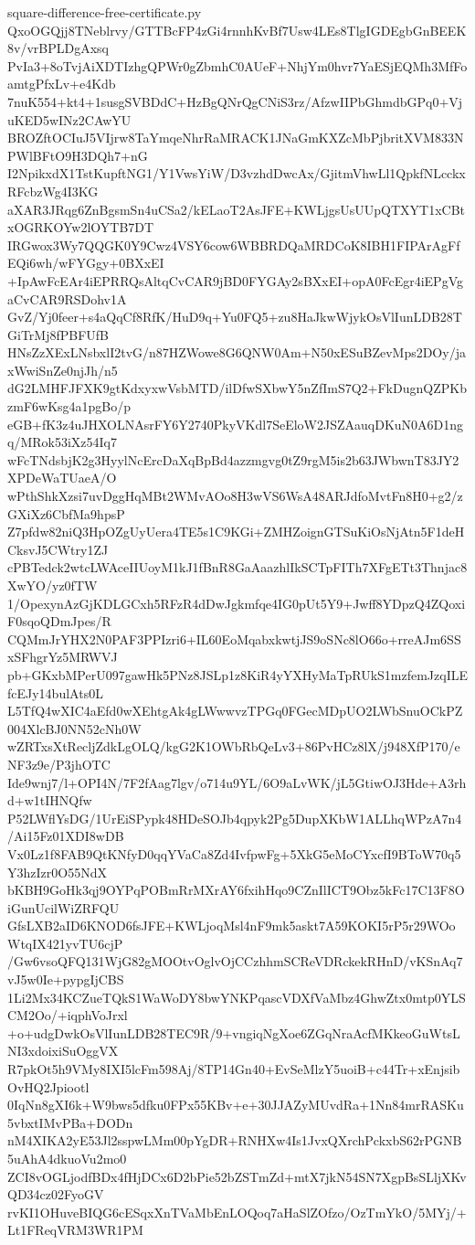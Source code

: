 \documentclass[11pt]{article}
\theoremstyle{definition}
\theoremstyle{remark}
\begin{document}
\begin{filecontents*}[overwrite]{square-difference-free-certificate.py}
QxoOGQjj8TNeblrvy/GTTBcFP4zGi4rnnhKvBf7Usw4LEs8TlgIGDEgbGnBEEK8v/vrBPLDgAxsq
PvIa3+8oTvjAiXDTIzhgQPWr0gZbmhC0AUeF+NhjYm0hvr7YaESjEQMh3MfFoamtgPfxLv+e4Kdb
7nuK554+kt4+1susgSVBDdC+HzBgQNrQgCNiS3rz/AfzwIIPbGhmdbGPq0+VjuKED5wINz2CAwYU
BROZftOCIuJ5VIjrw8TaYmqeNhrRaMRACK1JNaGmKXZcMbPjbritXVM833NPWlBFtO9H3DQh7+nG
I2NpikxdX1TstKupftNG1/Y1VwsYiW/D3vzhdDwcAx/GjitmVhwLl1QpkfNLcckxRFcbzWg4I3KG
aXAR3JRqg6ZnBgsmSn4uCSa2/kELaoT2AsJFE+KWLjgsUsUUpQTXYT1xCBtxOGRKOYw2lOYTB7DT
IRGwox3Wy7QQGK0Y9Cwz4VSY6cow6WBBRDQaMRDCoK8IBH1FIPArAgFfEQi6wh/wFYGgy+0BXxEI
+IpAwFcEAr4iEPRRQsAltqCvCAR9jBD0FYGAy2sBXxEI+opA0FcEgr4iEPgVgaCvCAR9RSDohv1A
GvZ/Yj0feer+s4aQqCf8RfK/HuD9q+Yu0FQ5+zu8HaJkwWjykOsVlIunLDB28TGiTrMj8fPBFUfB
HNsZzXExLNsbxlI2tvG/n87HZWowe8G6QNW0Am+N50xESuBZevMps2DOy/jaxWwiSnZe0njJh/n5
dG2LMHFJFXK9gtKdxyxwVsbMTD/ilDfwSXbwY5nZfImS7Q2+FkDugnQZPKbzmF6wKsg4a1pgBo/p
eGB+fK3z4uJHXOLNAsrFY6Y2740PkyVKdl7SeEloW2JSZAauqDKuN0A6D1ngq/MRok53iXz54Iq7
wFcTNdsbjK2g3HyylNcErcDaXqBpBd4azzmgvg0tZ9rgM5is2b63JWbwnT83JY2XPDeWaTUaeA/O
wPthShkXzsi7uvDggHqMBt2WMvAOo8H3wVS6WsA48ARJdfoMvtFn8H0+g2/zGXiXz6CbfMa9hpsP
Z7pfdw82niQ3HpOZgUyUera4TE5s1C9KGi+ZMHZoignGTSuKiOsNjAtn5F1deHCksvJ5CWtry1ZJ
cPBTedck2wtcLWAceIIUoyM1kJ1fBnR8GaAaazhlIkSCTpFITh7XFgETt3Thnjac8XwYO/yz0fTW
1/OpexynAzGjKDLGCxh5RFzR4dDwJgkmfqe4IG0pUt5Y9+Jwff8YDpzQ4ZQoxiF0sqoQDmJpes/R
CQMmJrYHX2N0PAF3PPIzri6+IL60EoMqabxkwtjJS9oSNc8lO66o+rreAJm6SSxSFhgrYz5MRWVJ
pb+GKxbMPerU097gawHk5PNz8JSLp1z8KiR4yYXHyMaTpRUkS1mzfemJzqILEfcEJy14bulAts0L
L5TfQ4wXIC4aEfd0wXEhtgAk4gLWwwvzTPGq0FGecMDpUO2LWbSnuOCkPZ004XlcBJ0NN52cNh0W
wZRTxsXtRecljZdkLgOLQ/kgG2K1OWbRbQeLv3+86PvHCz8lX/j948XfP170/eNF3z9e/P3jhOTC
Ide9wnj7/l+OPI4N/7F2fAag7lgv/o714u9YL/6O9aLvWK/jL5GtiwOJ3Hde+A3rhd+w1tIHNQfw
P52LWflYsDG/1UrEiSPypk48HDeSOJb4qpyk2Pg5DupXKbW1ALLhqWPzA7n4/Ai15Fz01XDI8wDB
Vx0Lz1f8FAB9QtKNfyD0qqYVaCa8Zd4IvfpwFg+5XkG5eMoCYxcfI9BToW70q5Y3hzIzr0O55NdX
bKBH9GoHk3qj9OYPqPOBmRrMXrAY6fxihHqo9CZnIlICT9Obz5kFc17C13F8OiGunUcilWiZRFQU
GfsLXB2aID6KNOD6fsJFE+KWLjoqMsl4nF9mk5askt7A59KOKI5rP5r29WOoWtqIX421yvTU6cjP
/Gw6vsoQFQ131WjG82gMOOtvOglvOjCCzhhmSCReVDRckekRHnD/vKSnAq7vJ5w0Ie+pypgIjCBS
1Li2Mx34KCZueTQkS1WaWoDY8bwYNKPqascVDXfVaMbz4GhwZtx0mtp0YLSCM2Oo/+iqphVoJrxl
+o+udgDwkOsVlIunLDB28TEC9R/9+vngiqNgXoe6ZGqNraAcfMKkeoGuWtsLNI3xdoixiSuOggVX
R7pkOt5h9VMy8IXI5lcFm598Aj/8TP14Gn40+EvSeMlzY5uoiB+c44Tr+xEnjsibOvHQ2Jpiootl
0IqNn8gXI6k+W9bws5dfku0FPx55KBv+e+30JJAZyMUvdRa+1Nn84mrRASKu5vbxtIMvPBa+DODn
nM4XIKA2yE53Jl2sspwLMm00pYgDR+RNHXw4Is1JvxQXrchPckxbS62rPGNB5uAhA4dkuoVu2mo0
ZCI8vOGLjodfBDx4fHjDCx6D2bPie52bZSTmZd+mtX7jkN54SN7XgpBsSLljXKvQD34cz02FyoGV
rvKI1OHuveBIQG6cESqxXnTVaMbEnLOQoq7aHaSlZOfzo/OzTmYkO/5MYj/+Lt1FReqVRM3WR1PM

\end{filecontents*}
\end{document}
